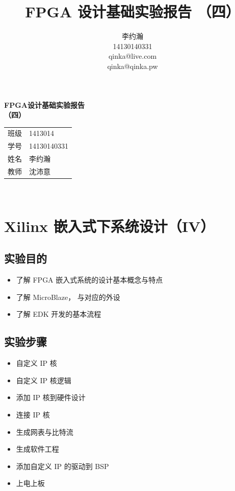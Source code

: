 \documentclass{ctexart}
\author{李约瀚 \\ 14130140331 \\ qinka@live.com \\ qinka@qinka.pw}
\title{FPGA 设计基础实验报告 （四）}
\begin{document}
\thispagestyle{empty}
\begin{center}
  \vspace*{4em}
  {\Huge\textbf{FPGA设计基础实验报告\\\vspace*{0.5em} （四）}}
  \vfill
  \large
  \begin{tabular}{c@{：}l}
    班级 & 1413014 \\
    学号 & 14130140331 \\ 
    姓名 & 李约瀚 \\ 
    教师 & 沈沛意 \\
  \end{tabular} 
  \vspace*{4em}\\
\end{center}
\newpage

\setcounter{page}{0}
\setcounter{section}{0}


\section{Xilinx 嵌入式下系统设计（IV）}
        
\subsection{实验目的}
\begin{itemize}
\item 了解 FPGA 嵌入式系统的设计基本概念与特点
\item 了解 MicroBlaze， 与对应的外设
\item 了解 EDK 开发的基本流程
\end{itemize}

\subsection{实验步骤}

\begin{itemize}
\item 自定义 IP 核
\item 自定义 IP 核逻辑
\item 添加 IP 核到硬件设计
\item 连接 IP 核
\item 生成网表与比特流
\item 生成软件工程
\item 添加自定义 IP 的驱动到 BSP
\item 上电上板
\end{itemize}
\end{document}
